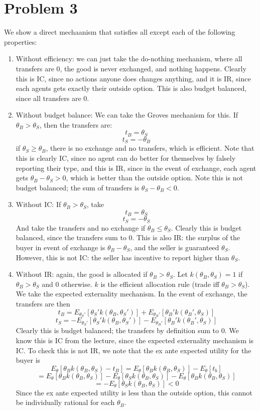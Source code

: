 \documentclass[10pt,letter]{article}
\begin{document}
\section*{Problem 3}
We show a direct mechaanism that satisfies all except each of the following properties:
\begin{enumerate}[label=(\roman*)]
  \item Without efficiency: we can just take the do-nothing mechanism, where all transfers are 0, the good is never exchanged, and nothing happens. Clearly this is IC, since no actions anyone does changes anything, and it is IR, since each agents gets exactly their outside option. This is also budget balanced, since all transfers are 0.
  \item Without budget balance: We can take the Groves mechanism for this. If $\theta_B > \theta_S$, then the transfers are:
  \[ t_B = \theta_S \]
  \[ t_S = - \theta_B \]
  if $\theta_S \ge \theta_B$, there is no exchange and no transfers, which is efficient. Note that this is clearly IC, since no agent can do better for themselves by falsely reporting their type, and this is IR, since in the event of exchange, each agent gets $\theta_B - \theta_S > 0$, which is better than the outside option. Note this is not budget balanced; the sum of transfers is $\theta_S - \theta_B < 0$.
  \item Without IC: If $\theta_B > \theta_S$, take
  \[ t_B = \theta_S \]
  \[ t_S = - \theta_S \]
  And take the transfers and no exchange if $\theta_B \le \theta_S$.
  Clearly this is budget balanced, since the transfers sum to 0. This is also IR: the surplus of the buyer in event of exchange is $\theta_B - \theta_S$, and the seller is guaranteed $\theta_S$. However, this is not IC: the seller has incentive to report higher than $\theta_S$.
  \item Without IR: again, the good is allocated if $\theta_B > \theta_S$. Let $k(\theta_B, \theta_S) = 1$ if $\theta_B > \theta_S$ and $0$ otherwise. $k$ is the efficient allocation rule (trade iff $\theta_B > \theta_S$). We take the expected externality mechanism. In the event of exchange, the transfers are then
  \[ t_B = E_{\theta_S'}[\theta_{S}' k(\theta_B, \theta_S')] + E_{\theta_B'}[\theta_{B}' k(\theta_B', \theta_S)] \]
  \[ t_S = -E_{\theta_S'}[\theta_{S}' k(\theta_B, \theta_S')] - E_{\theta_B'}[\theta_{B}' k(\theta_B', \theta_S)] \]
  Clearly this is budget balanced; the transfers by definition sum to 0. We know this is IC from the lecture, since the expected externality mechanism is IC. To check this is not IR, we note that the ex ante expected utility for the buyer is
  \[ E_{\theta}[\theta_B k(\theta_B, \theta_S) - t_B] =  E_{\theta}[\theta_B k(\theta_B, \theta_S)] - E_{\theta}[t_b] \]
\[ = E_{\theta}[\theta_B k(\theta_B, \theta_S)] - E_{\theta}[\theta_{S} k(\theta_B, \theta_S)]- E_{\theta}[\theta_{B} k(\theta_B, \theta_S)]\]
\[ = - E_{\theta}[\theta_{S} k(\theta_B, \theta_S)] < 0\]
Since the ex ante expected utility is less than the outside option, this cannot be individually rational for each $\theta_B$.

\end{enumerate}
\end{document}
